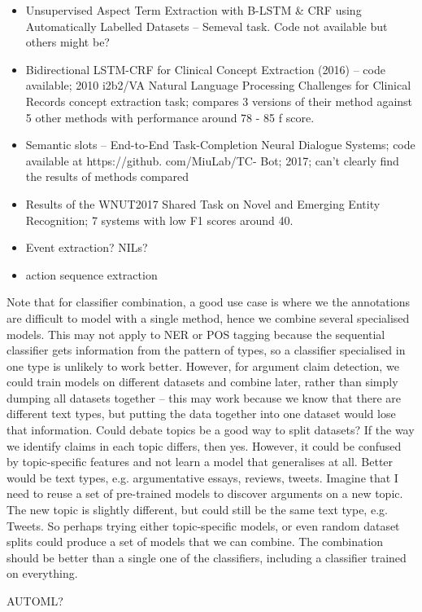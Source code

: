 \begin{itemize}
  \item Unsupervised Aspect Term Extraction with B-LSTM & CRF using Automatically Labelled Datasets -- Semeval task. Code not available but others might be?
  \item Bidirectional LSTM-CRF for Clinical Concept Extraction (2016) -- code available; 2010 i2b2/VA Natural Language Processing Challenges for Clinical Records concept extraction task; compares 3 versions of their method against 5 other methods with performance around 78 - 85 f score.
  \item Semantic slots -- End-to-End Task-Completion Neural Dialogue Systems; code available at https://github. com/MiuLab/TC- Bot; 2017; can't clearly find the results of methods compared
\item Results of the WNUT2017 Shared Task on Novel and Emerging Entity Recognition; 7 systems with low F1 scores around 40. 
\item Event extraction? NILs?
\item action sequence extraction
\end{itemize}

Note that for classifier combination, a good use case is where we the annotations are difficult to model with a single method, hence we combine several specialised models. This may not apply to NER or POS tagging because the sequential classifier gets information from the pattern of types, so a classifier specialised in one type is unlikely to work better. However, for argument claim detection, we could train models on different datasets and combine later, rather than simply dumping all datasets together -- this may work because we know that there are different text types, but putting the data together into one dataset would lose that information. Could debate topics be a good way to split datasets? If the way we identify claims in each topic differs, then yes. However, it could be confused by topic-specific features and not learn a model that generalises at all. Better would be text types, e.g. argumentative essays, reviews, tweets. Imagine that I need to reuse a set of pre-trained models to discover arguments on a new topic. The new topic is slightly different, but could still be the same text type, e.g. Tweets. So perhaps trying either topic-specific models, or even random dataset splits could produce a set of models that we can combine. The combination should be better than a single one of the classifiers, including a classifier trained on everything.     

AUTOML?
